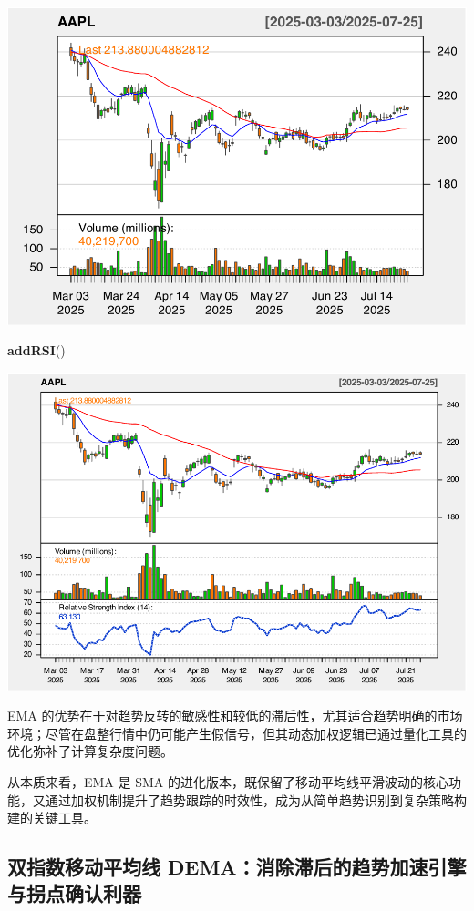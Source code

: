\documentclass[]{ctexbook}
\newenvironment{Shaded}{\begin{snugshade}}{\end{snugshade}}
\newcommand{\FunctionTok}[1]{\textcolor[rgb]{0.13,0.29,0.53}{\textbf{#1}}}
\newcommand{\NormalTok}[1]{#1}
\begin{document}
\includegraphics[width=0.9\linewidth]{QuantmodHandbook_files/figure-latex/ema_2-3}

\begin{Shaded}
\begin{Highlighting}[]
\FunctionTok{addRSI}\NormalTok{()}
\end{Highlighting}
\end{Shaded}

\includegraphics[width=0.9\linewidth]{QuantmodHandbook_files/figure-latex/ema_2-4}

EMA 的优势在于对趋势反转的敏感性和较低的滞后性，尤其适合趋势明确的市场环境；尽管在盘整行情中仍可能产生假信号，但其动态加权逻辑已通过量化工具的优化弥补了计算复杂度问题。

从本质来看，EMA 是 SMA 的进化版本，既保留了移动平均线平滑波动的核心功能，又通过加权机制提升了趋势跟踪的时效性，成为从简单趋势识别到复杂策略构建的关键工具。

\subsection{双指数移动平均线 DEMA：消除滞后的趋势加速引擎与拐点确认利器}\label{ux53ccux6307ux6570ux79fbux52a8ux5e73ux5747ux7ebf-demaux6d88ux9664ux6edeux540eux7684ux8d8bux52bfux52a0ux901fux5f15ux64ceux4e0eux62d0ux70b9ux786eux8ba4ux5229ux5668}
\end{document}
